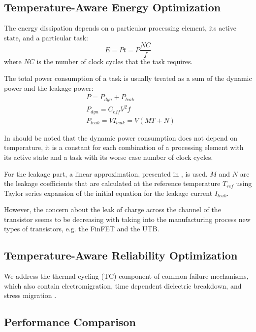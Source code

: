 \subsection{Temperature-Aware Energy Optimization}
The energy dissipation depends on a particular processing element, its active state, and a particular task:
\[
  E = P t = P \frac{NC}{f}
\]
where $NC$ is the number of clock cycles that the task requires.

The total power consumption of a task is usually treated as a sum of the dynamic power and the leakage power:
\begin{align*}
  & P = P_{dyn} + P_{leak} \\
  & P_{dyn} = C_{eff} V^2 f \\
  & P_{leak} = V I_{leak} = V (MT + N)
\end{align*}

In should be noted that the dynamic power consumption does not depend on temperature, it is a constant for each combination of a processing element with its active state and a task with its worse case number of clock cycles.

For the leakage part, a linear approximation, presented in \cite{liu2007}, is used. $M$ and $N$ are the leakage coefficients that are calculated at the reference temperature $T_{ref}$ using Taylor series expansion of the initial equation for the leakage current $I_{leak}$.

However, the concern about the leak of charge across the channel of the transistor seems to be decreasing with taking into the manufacturing process new types of transistors, e.g. the FinFET and the UTB.




\subsection{Temperature-Aware Reliability Optimization}
We address the thermal cycling (TC) component of common failure mechanisms, which also contain electromigration, time dependent dielectric breakdown, and stress migration \cite{xiang2010}.


\subsection{Performance Comparison} \label{sec:comparison}
